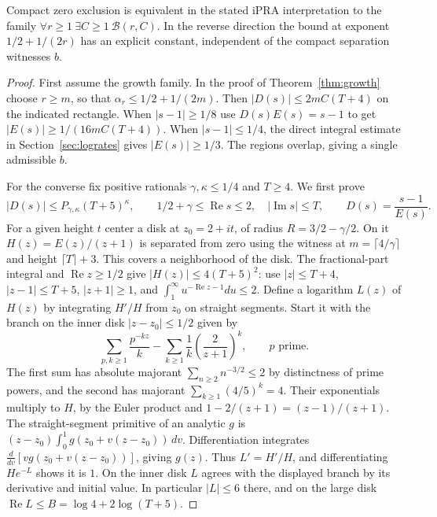 \begin{theorem}\label{thm:compact-rh}
Compact zero exclusion is equivalent in the stated iPRA interpretation
to the family $\forall r\ge1\ \exists C\ge1\ \mathcal B(r,C)$.
In the reverse direction the bound at exponent $1/2+1/(2r)$ has an
explicit constant, independent of the compact separation witnesses $b$.
\end{theorem}
\begin{proof}
First assume the growth family. In the proof of
Theorem~\ref{thm:growth} choose $r\ge m$, so that
$\alpha_r\le1/2+1/(2m)$. Then
$|D(s)|\le2mC(T+4)$ on the indicated rectangle.
When $|s-1|\ge1/8$ use $D(s)E(s)=s-1$ to get
$|E(s)|\ge1/(16mC(T+4))$. When $|s-1|\le1/4$, the direct integral
estimate in Section~\ref{sec:logrates} gives $|E(s)|\ge1/3$.
The regions overlap, giving a single admissible $b$.

For the converse fix positive rationals $\gamma,\kappa\le1/4$ and
$T\ge4$. We first prove
\begin{equation}\label{eq:subpower}
 |D(s)|\le P_{\gamma,\kappa}(T+5)^\kappa,
 \qquad 1/2+\gamma\le\operatorname{Re}s\le2,\quad |\operatorname{Im}s|\le T,
 \qquad D(s)=\frac{s-1}{E(s)} .
\end{equation}
For a given height $t$ center a disk at $z_0=2+it$, of radius
$R=3/2-\gamma/2$. On it
$H(z)=E(z)/(z+1)$ is separated from zero using the witness at
$m=\lceil4/\gamma\rceil$ and height $\lceil T\rceil+3$. This covers
a neighborhood of the disk. The fractional-part integral and
$\operatorname{Re}z\ge1/2$ give $|H(z)|\le4(T+5)^2$:
use $|z|\le T+4$, $|z-1|\le T+5$, $|z+1|\ge1$, and
$\int_1^\infty u^{-\operatorname{Re}z-1}du\le2$.
Define a logarithm $L(z)$ of $H(z)$ by integrating $H'/H$ from $z_0$
on straight segments. Start it with the branch on the inner disk
$|z-z_0|\le1/2$ given by
\[
    \sum_{p,k\ge1}\frac{p^{-kz}}{k}
       -\sum_{k\ge1}\frac1k\left(\frac{2}{z+1}\right)^k,
       \qquad p\text{ prime}.
\]
The first sum has absolute majorant $\sum_{n\ge2}n^{-3/2}\le2$ by
distinctness of prime powers, and the second has majorant
$\sum_{k\ge1}(4/5)^k=4$. Their exponentials multiply to $H$, by the
Euler product and $1-2/(z+1)=(z-1)/(z+1)$.
The straight-segment primitive of an analytic $g$ is
$(z-z_0)\int_0^1g(z_0+v(z-z_0))\,dv$. Differentiation integrates
$\frac{d}{dv}[v g(z_0+v(z-z_0))]$, giving $g(z)$.
Thus $L'=H'/H$, and differentiating $H e^{-L}$ shows it is $1$.
On the inner disk $L$ agrees with the displayed branch by its
derivative and initial value. In particular $|L|\le6$ there, and on
the large disk $\operatorname{Re}L\le B=\log4+2\log(T+5)$.


\end{proof}
